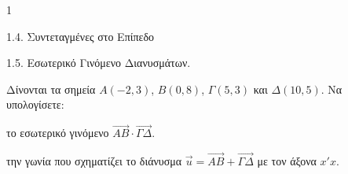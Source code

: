 \begin{ylh}{1}
    \item 1.4. Συντεταγμένες στο Επίπεδο
    \item 1.5. Εσωτερικό Γινόμενο Διανυσμάτων.
\end{ylh}
Δίνονται τα σημεία $A(-2, 3)$, $B(0, 8)$, $\Gamma(5, 3)$ και $\Delta(10, 5)$. Να υπολογίσετε:
\begin{alist}
\item το εσωτερικό γινόμενο $\vec{AB} \cdot \vec{\Gamma\Delta}$. 
\item την γωνία που σχηματίζει το διάνυσμα $\vec{u} = \vec{AB} + \vec{\Gamma\Delta}$ με τον άξονα $x'x$. 
\end{alist}
